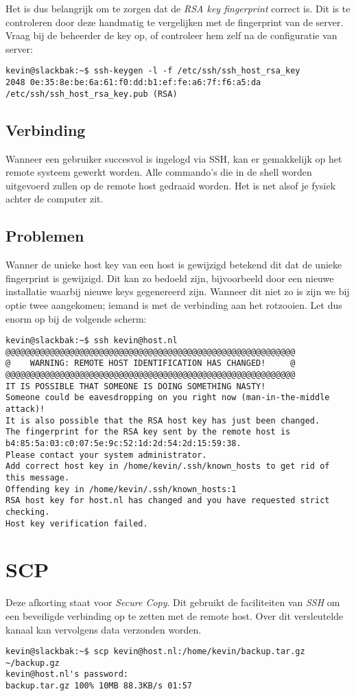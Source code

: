 Het is dus belangrijk om te zorgen dat de \emph{RSA key fingerprint} correct is. Dit is te controleren door deze handmatig te vergelijken met de fingerprint van de server. Vraag bij de beheerder de key op, of controleer hem zelf na de configuratie van server:
\begin{lstlisting}
kevin@slackbak:~$ ssh-keygen -l -f /etc/ssh/ssh_host_rsa_key
2048 0e:35:8e:be:6a:61:f0:dd:b1:ef:fe:a6:7f:f6:a5:da /etc/ssh/ssh_host_rsa_key.pub (RSA)
\end{lstlisting}%

\subsection{Verbinding}
Wanneer een gebruiker succesvol is ingelogd via SSH, kan er gemakkelijk op het remote systeem gewerkt worden. Alle commando's die in de shell worden uitgevoerd zullen op de remote host gedraaid worden. Het is net alsof je fysiek achter de computer zit. 

\subsection{Problemen}
Wanner de unieke host key van een host is gewijzigd betekend dit dat de unieke fingerprint is gewijzigd. Dit kan zo bedoeld zijn, bijvoorbeeld door een nieuwe installatie waarbij nieuwe keys gegenereerd zijn. Wanneer dit niet zo is zijn we bij optie twee aangekomen; iemand is met de verbinding aan het rotzooien. Let dus enorm op bij de volgende scherm:
\begin{lstlisting}
kevin@slackbak:~$ ssh kevin@host.nl
@@@@@@@@@@@@@@@@@@@@@@@@@@@@@@@@@@@@@@@@@@@@@@@@@@@@@@@@@@@
@    WARNING: REMOTE HOST IDENTIFICATION HAS CHANGED!     @
@@@@@@@@@@@@@@@@@@@@@@@@@@@@@@@@@@@@@@@@@@@@@@@@@@@@@@@@@@@
IT IS POSSIBLE THAT SOMEONE IS DOING SOMETHING NASTY!
Someone could be eavesdropping on you right now (man-in-the-middle attack)!
It is also possible that the RSA host key has just been changed.
The fingerprint for the RSA key sent by the remote host is
b4:85:5a:03:c0:07:5e:9c:52:1d:2d:54:2d:15:59:38.
Please contact your system administrator.
Add correct host key in /home/kevin/.ssh/known_hosts to get rid of this message.
Offending key in /home/kevin/.ssh/known_hosts:1
RSA host key for host.nl has changed and you have requested strict checking.
Host key verification failed.
\end{lstlisting}%

\section{SCP}
Deze afkorting staat voor \emph{Secure Copy}. Dit gebruikt de faciliteiten van 
\emph{SSH} om een beveiligde verbinding op te zetten met de remote host. Over dit versleutelde kanaal kan vervolgens data verzonden worden. 
\begin{lstlisting}
kevin@slackbak:~$ scp kevin@host.nl:/home/kevin/backup.tar.gz ~/backup.gz
kevin@host.nl's password: 
backup.tar.gz 100% 10MB 88.3KB/s 01:57
\end{lstlisting}%

